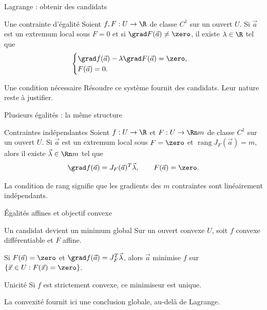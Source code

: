 \begin{frame}[t]{Lagrange : obtenir des candidats}
\coursanalyse
\begin{theoreme}{Une contrainte d’égalité}
Soient $f,F:U\to\R$ de classe $C^1$ sur un ouvert $U$. Si $\vec a$ est un extremum local sous $F=0$ et si $\grad F(\vec a)\ne\zero$, il existe $\lambda\in\R$ tel que
\[\begin{cases}\grad f(\vec a)-\lambda\grad F(\vec a)=\zero,\\F(\vec a)=0.\end{cases}\]
\end{theoreme}
\begin{resultat}{Une condition nécessaire}
Résoudre ce système fournit des candidats. Leur nature reste à justifier.
\end{resultat}
\end{frame}

\begin{frame}[t]{Plusieurs égalités : la même structure}
\coursanalyse
\begin{theoreme}{Contraintes indépendantes}
Soient $f:U\to\R$ et $F:U\to\Rn m$ de classe $C^1$ sur un ouvert $U$.
Si $\vec a$ est un extremum local sous $F=\zero$ et $\operatorname{rang}J_F(\vec a)=m$, alors il existe $\vec\lambda\in\Rn m$ tel que
\[\grad f(\vec a)=J_F(\vec a)^T\vec\lambda,\qquad F(\vec a)=\zero.\]
\end{theoreme}\vfill La condition de rang signifie que les gradients des $m$ contraintes sont linéairement indépendants.
\end{frame}

\begin{frame}[t]{Égalités affines et objectif convexe}
\coursanalyse
\begin{theoreme}{Un candidat devient un minimum global}
Sur un ouvert convexe $U$, soit $f$ convexe différentiable et $F$ affine.
\medskip\par Si $F(\vec a)=\zero$ et $\grad f(\vec a)=J_F^T\vec\lambda$, alors $\vec a$ minimise $f$ sur $\{\vec x\in U:F(\vec x)=\zero\}$.
\end{theoreme}
\begin{resultat}{Unicité}
Si $f$ est strictement convexe, ce minimiseur est unique.
\end{resultat}\vfill La convexité fournit ici une conclusion globale, au-delà de Lagrange.
\end{frame}

